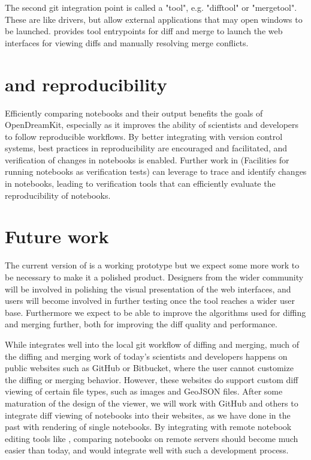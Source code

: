 \documentclass{deliverablereport}
\newcommand{\nbdime}{\software{nbdime}}
\begin{document}
The second git integration point is called a "tool", e.g. "difftool" or "mergetool".
These are like drivers, but allow external applications that may open windows to be launched.
\nbdime provides tool entrypoints for diff and merge to launch the web interfaces for viewing diffs
and manually resolving merge conflicts.


\section{\nbdime and reproducibility} %
\label{sec:nbdime_and_reproducibility}

Efficiently comparing notebooks and their output benefits the goals of OpenDreamKit,
especially as it improves the ability of scientists and developers to follow reproducible workflows.
By better integrating with version control systems,
best practices in reproducibility are encouraged and facilitated,
and verification of changes in notebooks is enabled.
Further work in  (Facilities for running notebooks as verification tests)
can leverage \nbdime to trace and identify changes in notebooks,
leading to verification tools that can efficiently evaluate the reproducibility of notebooks.

\section{Future work}

The current version of \nbdime is a working prototype but we expect
some more work to be necessary to make it a polished product.
Designers from the wider \Jupyter community will be involved in
polishing the visual presentation of the web interfaces,
and users will become involved in further testing once the tool
reaches a wider user base. Furthermore we expect to be able to
improve the algorithms used for diffing and merging further,
both for improving the diff quality and performance.

While \nbdime integrates well into the local git workflow of diffing
and merging, much of the diffing and merging work of today's
scientists and developers happens on public websites such as GitHub or
Bitbucket, where the user cannot customize the diffing or merging
behavior.  However, these websites do support custom diff viewing of
certain file types, such as images and GeoJSON files.  After some
maturation of the design of the  viewer, we
will work with GitHub and others to integrate diff viewing of
notebooks into their websites, as we have done in the past with
rendering of single notebooks.  By integrating \nbdime with remote
notebook editing tools like , comparing notebooks
on remote servers should become much easier than today, and would
integrate well with such a development process.
\end{document}
